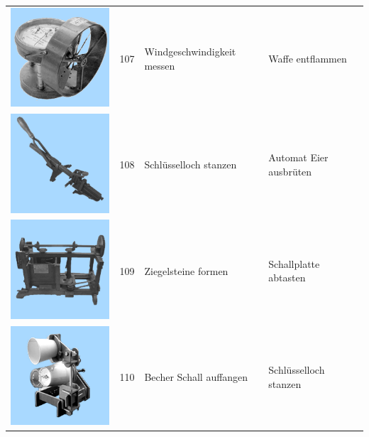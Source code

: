 \documentclass[
  english,
  man,floatsintext]{apa7}
\begin{document}
\begin{center}
\begin{ThreePartTable}
\begin{longtable}{llll}
\includegraphics[valign=c, scale=0.19]{../materials/unfamiliar/107.png} & 107 & Windgeschwindigkeit messen & Waffe entflammen\\
\includegraphics[valign=c, scale=0.19]{../materials/unfamiliar/108.png} & 108 & Schlüsselloch stanzen & Automat Eier ausbrüten\\
\includegraphics[valign=c, scale=0.19]{../materials/unfamiliar/109.png} & 109 & Ziegelsteine formen & Schallplatte abtasten\\
\includegraphics[valign=c, scale=0.19]{../materials/unfamiliar/110.png} & 110 & Becher Schall auffangen & Schlüsselloch stanzen\\

\end{longtable}
\end{ThreePartTable}
\end{center}
\end{document}
